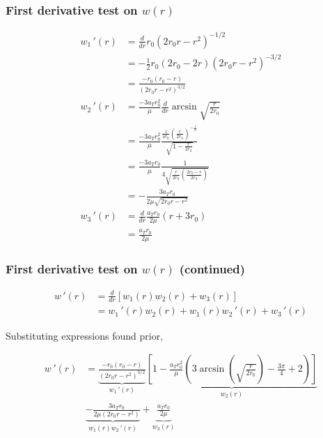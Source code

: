 \documentclass{beamer}
\begin{document}
\begin{frame}
    \frametitle{First derivative test on $w(r)$}

    {\tiny\begin{align}
        w_1\,'(r)&=\frac{d}{dr}r_0(2r_0r-r^2)^{-1/2}\\
        &=-\frac{1}{2}r_0(2r_0-2r)(2r_0r-r^2)^{-3/2}\\
        &=\frac{-r_0(r_0-r)}{(2r_0r-r^2)^{3/2}}\\
        w_2\,'(r)&=\frac{-3a_Tr_0^2}{\mu}\frac{d}{dr}\arcsin \sqrt{\frac{r}{2r_0}}\\
        &=\frac{-3a_Tr_0^2}{\mu}\frac{\frac{1}{4r_0}(\frac{r}{2r_0})^{-\frac{1}{2}}}{\sqrt{1-\frac{r}{2r_0}}}\\
        &=\frac{-3a_Tr_0}{\mu}\frac{1}{4\sqrt{\frac{r}{2r_0}(\frac{2r_0-r}{2r_0})}}\\
        &=-\frac{3a_Tr_0}{2\mu\sqrt{2r_0r-r^2}}\\
        w_3\,'(r)&=\frac{d}{dr}\frac{a_Tr_0}{2\mu}(r+3r_0)\\
        &=\frac{a_Tr_0}{2\mu}
    \end{align}}
\end{frame}

\begin{frame}
    \frametitle{First derivative test on $w(r)$ (continued)}

    \begin{align}
        w\,'(r)&=\frac{d}{dr}\left[w_1(r)w_2(r)+w_3(r)\right]\\
        &=w_1\,'(r)w_2(r)+w_1(r)w_2\,'(r)+w_3\,'(r)
    \end{align}

    Substituting expressions found prior,

    {\scriptsize\begin{align}
        w\,'(r)&=\underbrace{\frac{-r_0(r_0-r)}{(2r_0r-r^2)^{3/2}}}_{w_1\,'(r)}\underbrace{\left[1-\frac{a_Tr_0^2}{\mu}\left(3\arcsin(\sqrt{\frac{r}{2r_0}})-\frac{3\pi}{4}+2\right)\right]}_{w_2(r)}\\
        &\underbrace{-\frac{3a_Tr_{0}}{2\mu\left(2 r_{0}r-r^2\right)}}_{w_1(r)w_2\,'(r)}+\underbrace{\frac{a_Tr_0}{2\mu}}_{w_3(r)}
    \end{align}}

\end{frame}
\end{document}
